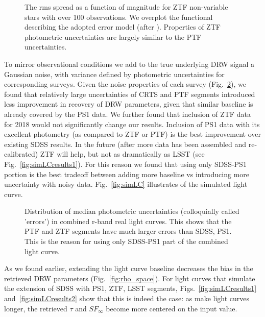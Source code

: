 \documentclass[twocolumn]{aastex62}
\begin{document}
\begin{figure}%
\caption{The rms spread as a function of magnitude for ZTF non-variable stars with over 100 observations. We overplot the functional describing the adopted error model (after \citealt{ivezic2019}). Properties of ZTF photometric uncertainties are largely similar to the PTF uncertainties.}
\label{fig:ztf_errors}
\end{figure} 


To mirror observational conditions we add to the true underlying DRW signal a Gaussian noise, with variance defined by photometric uncertainties for corresponding surveys. Given the noise properties of each survey (Fig.~\ref{fig:combinedLCerrors}), we found that relatively large uncertainties of CRTS and PTF segments introduced less improvement in recovery of DRW parameters, given that similar baseline is already covered by the PS1 data.  We further found that inclusion of ZTF data for 2018 would not significantly change our results. Inclusion of PS1 data with its excellent photometry (as compared to ZTF or PTF) is the best improvement over existing SDSS results.  In the future (after more data has been assembled and re-calibrated) ZTF will help, but not as dramatically as LSST (see Fig.~\ref{fig:simLCresults1}).  For this reason we found that using only SDSS-PS1 portion is the best tradeoff between adding more baseline vs introducing more uncertainty with noisy data. Fig.~\ref{fig:simLC} illustrates  of  the simulated light curve. 

\begin{figure}%
\caption{Distribution of median photometric uncertainties (colloquially called 'errors') in combined r-band real light curves. This shows that the PTF and ZTF segments have much larger errors than SDSS, PS1. This is the reason for using only SDSS-PS1 part of the combined light curve.}
\label{fig:combinedLCerrors}
\end{figure} 

As we found earlier, extending the light curve baseline decreases the bias in the retrieved DRW parameters (Fig.~\ref{fig:rho_space}). For light curves that simulate the extension of SDSS with PS1, ZTF, LSST segments, Figs.~\ref{fig:simLCresults1} and~\ref{fig:simLCresults2} show that this is indeed the case: as make light curves longer, the retrieved $\tau$ and $SF_{\infty}$ become more centered on the input value. 

\begin{figure*}
\caption{Retrieved $\tau$ and $\sigma$  parameters for simulated LCs. }
\label{fig:simLCresults1}
\end{figure*} 
\end{document}
